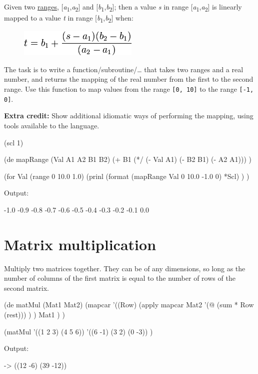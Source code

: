 Given two
\href{http://en.wikipedia.org/wiki/Interval\_(mathematics)}{ranges},
{[}\emph{a}\textsubscript{1},\emph{a}\textsubscript{2}{]} and
{[}\emph{b}\textsubscript{1},\emph{b}\textsubscript{2}{]}; then a value
\emph{s} in range
{[}\emph{a}\textsubscript{1},\emph{a}\textsubscript{2}{]} is linearly
mapped to a value \emph{t} in range
{[}\emph{b}\textsubscript{1},\emph{b}\textsubscript{2}{]} when:

\begin{figure}[H]
\centering
\includegraphics[scale=.6]{graphics/864ab514eca1fb4403576eb20ee0cb22.png}
\end{figure}

The task is to write a function/subroutine/\ldots{} that takes two
ranges and a real number, and returns the mapping of the real number
from the first to the second range. Use this function to map values from
the range \texttt{{[}0, 10{]}} to the range \texttt{{[}-1, 0{]}}.

\textbf{Extra credit:} Show additional idiomatic ways of performing the
mapping, using tools available to the language.


\begin{wideverbatim}

(scl 1)

(de mapRange (Val A1 A2 B1 B2)
   (+ B1 (*/ (- Val A1) (- B2 B1) (- A2 A1))) )


(for Val (range 0 10.0 1.0)
   (prinl
      (format (mapRange Val 0 10.0 -1.0 0) *Scl) ) )

Output:

-1.0
-0.9
-0.8
-0.7
-0.6
-0.5
-0.4
-0.3
-0.2
-0.1
0.0

\end{wideverbatim}

\pagebreak{}
\section*{Matrix multiplication}

Multiply two matrices together. They can be of any dimensions, so long
as the number of columns of the first matrix is equal to the number of
rows of the second matrix.


\begin{wideverbatim}

(de matMul (Mat1 Mat2)
   (mapcar
      '((Row)
         (apply mapcar Mat2
            '(@ (sum * Row (rest))) ) )
      Mat1 ) )

(matMul
   '((1 2 3) (4 5 6))
   '((6 -1) (3 2) (0 -3)) )

Output:

-> ((12 -6) (39 -12))

\end{wideverbatim}

